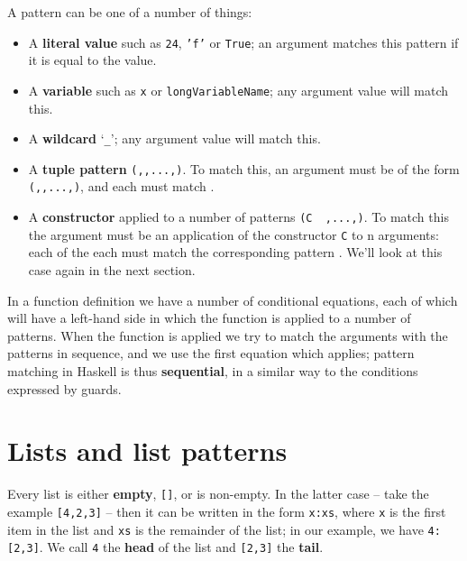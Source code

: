 A pattern can be one of a number of things:
{\raggedright
\begin{itemize}
\item A {\bf literal value} such as \texttt{24}, \texttt{'f'} or
\texttt{True}; an argument matches this pattern if it is equal to the
value.
\item A {\bf variable} such as \texttt{x} or
\texttt{longVariableName}; any argument value will match
this.
\item A {\bf wildcard} `\verb+_+'; any argument
value will match this.
\item A {\bf tuple pattern}
\texttt{(\pone,\ptwo,...,)}. To match this, an
argument must be of the form \texttt{(\vone,\vtwo,...,\vn)},
and each \texttt{} must match
\texttt{}.
\item A {\bf constructor} applied to a number of patterns \texttt{(C \pone\ \ptwo,...,)}. To match this the argument must be an application of the constructor \texttt{C} to n arguments: each of the each \texttt{} must match the corresponding pattern \texttt{}. We'll look at this case again in the next section.
\end{itemize}
} %

\noindent
In a function definition we have a number of conditional
equations, each of which will have a left-hand side in which the
function is applied to a number of patterns. When the function is
applied we try to match the arguments with the patterns in
sequence, and we use the first equation which applies; pattern
matching in Haskell is thus \textbf{sequential}, in a similar way to
the conditions expressed by guards.

\section{Lists and list patterns}

Every list is either \textbf{empty}, \texttt{[]},\minx{[]} or is non-empty.
In the latter case -- take the example \texttt{[4,2,3]}\minx{:}
-- then it can be written in the form \texttt{x:xs}, where \texttt{x}
is the first item in the list and \texttt{xs} is the remainder of the list; in our example, we have
\texttt{4:[2,3]}. We call \texttt{4} the \textbf{head} of the
list and \texttt{[2,3]} the \textbf{tail}.

